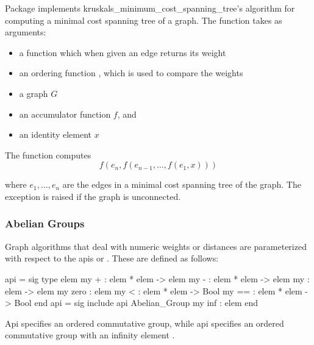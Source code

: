 Package  implements kruskals_minimum_cost_spanning_tree's algorithm for
computing a minimal cost spanning tree of a graph.
The function  takes as arguments:
\begin{itemize}
\item a  function which when given an edge returns its weight
\item an ordering function \sml{<}, which is used to compare the weights
\item a graph $G$
\item an accumulator function $f$, and
\item an identity element $x$
\end{itemize}
The function  computes
\[
   f(e_{n},f(e_{n-1},\ldots, f(e_1,x))) 
\]

where $e_1,\ldots,e_n$ are the edges in a minimal cost spanning tree 
of the graph.
The exception  is raised if the graph is unconnected.

\subsubsection{Abelian Groups}
  Graph algorithms that deal with numeric weights or distances
are parameterized with respect to the apis
 or .
These are defined as follows:
\begin{SML}
 api  = sig 
   type elem 
   my +    : elem * elem -> elem
   my -    : elem * elem -> elem
   my      : elem -> elem
   my zero : elem
   my <    : elem * elem -> Bool
   my ==   : elem * elem -> Bool
 end
 api  = sig
   include api Abelian_Group
   my inf : elem
 end
\end{SML}
Api  specifies an ordered commutative group,
while api  specifies an ordered commutative
group with an infinity element . 

